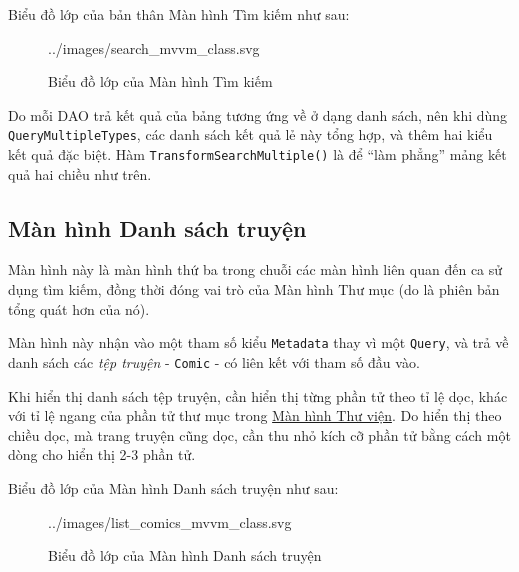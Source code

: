 \documentclass[../../../../thesis]{subfiles}
\begin{document}
Biểu đồ lớp của bản thân Màn hình Tìm kiếm như sau:

\begin{figure}[H]
    \centering
    
        {../images/search_mvvm_class.svg}
    \caption{Biểu đồ lớp của Màn hình Tìm kiếm}
    \label{fig:search_mvvm_class}
\end{figure}

Do mỗi DAO trả kết quả của bảng tương ứng về ở dạng danh sách, nên khi dùng
\texttt{QueryMultipleTypes}, các danh sách kết quả lẻ này tổng hợp, và thêm hai
kiểu kết quả đặc biệt. Hàm \texttt{TransformSearchMultiple()} là để ``làm
phẳng'' mảng kết quả hai chiều như trên.



\subsection{Màn hình Danh sách truyện}\label{sec:list-comic-design}

Màn hình này là màn hình thứ ba trong chuỗi các màn hình liên quan đến ca sử
dụng tìm kiếm, đồng thời đóng vai trò của Màn hình Thư mục (do là phiên bản tổng
quát hơn của nó).

Màn hình này nhận vào một tham số kiểu \texttt{Metadata} thay vì một
\texttt{Query}, và trả về danh sách các \emph{tệp truyện} - \texttt{Comic} - có
liên kết với tham số đầu vào.

Khi hiển thị danh sách tệp truyện, cần hiển thị từng phần tử theo tỉ lệ dọc,
khác với tỉ lệ ngang của phần tử thư mục trong \hyperref[sec:library-design]{Màn
hình Thư viện}. Do hiển thị theo chiều dọc, mà trang truyện cũng dọc, cần thu
nhỏ kích cỡ phần tử bằng cách một dòng cho hiển thị 2-3 phần tử.

Biểu đồ lớp của Màn hình Danh sách truyện như sau:

\begin{figure}[H]
    \centering
    
        {../images/list_comics_mvvm_class.svg}
    \caption{Biểu đồ lớp của Màn hình Danh sách truyện}
    \label{fig:list_comics_mvvm_class}
\end{figure}
\end{document}
